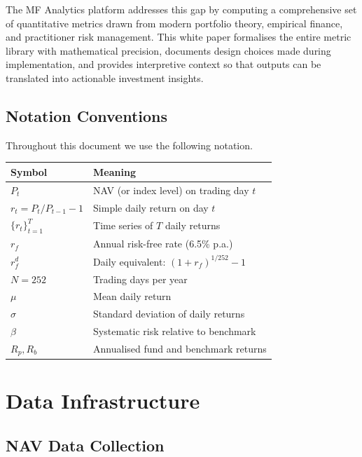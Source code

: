 \documentclass[12pt, a4paper]{article}
\newcommand{\rf}{r_f}
\begin{document}
The MF Analytics platform addresses this gap by computing a comprehensive
set of quantitative metrics drawn from modern portfolio theory, empirical
finance, and practitioner risk management.  This white paper formalises
the entire metric library with mathematical precision, documents design
choices made during implementation, and provides interpretive context so
that outputs can be translated into actionable investment insights.

\subsection{Notation Conventions}

Throughout this document we use the following notation.

\begin{center}
\begin{tabular}{@{}ll@{}}
\toprule
Symbol & Meaning \\
\midrule
$P_t$ & NAV (or index level) on trading day $t$ \\
$r_t = P_t/P_{t-1} - 1$ & Simple daily return on day $t$ \\
$\{r_t\}_{t=1}^{T}$ & Time series of $T$ daily returns \\
$\rf$ & Annual risk-free rate (6.5\% p.a.) \\
$r_f^d$ & Daily equivalent: $(1+\rf)^{1/252} - 1$ \\
$N = 252$ & Trading days per year \\
$\mu$ & Mean daily return \\
$\sigma$ & Standard deviation of daily returns \\
$\beta$ & Systematic risk relative to benchmark \\
$R_p, R_b$ & Annualised fund and benchmark returns \\
\bottomrule
\end{tabular}
\end{center}

\section{Data Infrastructure}

\subsection{NAV Data Collection}
\end{document}
